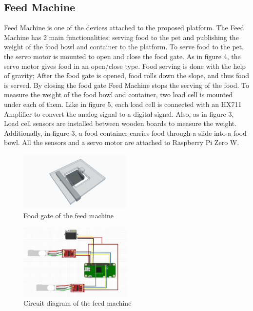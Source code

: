 \documentclass[conference]{IEEEtran}
\begin{document}
\subsection{Feed Machine}
Feed Machine is one of the devices attached to the proposed platform. The Feed Machine has 2 main functionalities: serving food to the pet and publishing the weight of the food bowl and container to the platform. To serve food to the pet, the servo motor is mounted to open and close the food gate. As in figure 4, the servo motor gives food in an open/close type. Food serving is done with the help of gravity; After the food gate is opened, food rolls down the slope, and thus food is served. By closing the food gate Feed Machine stops the serving of the food. To measure the weight of the food bowl and container, two load cell is mounted under each of them. Like in figure 5, each load cell is connected with an HX711 Amplifier to convert the analog signal to a digital signal. Also, as in figure 3, Load cell sensors are installed between wooden boards to measure the weight. Additionally, in figure 3, a food container carries food through a slide into a food bowl. All the sensors and a servo motor are attached to Raspberry Pi Zero W.

\begin{figure}[htbp]
\centerline{\includegraphics[width=0.5\textwidth]{./images/servo_gate.png}}
\caption{Food gate of the feed machine}
\label{fig}
\end{figure}

\begin{figure}[htbp]
\centerline{\includegraphics[width=0.5\textwidth]{./images/feed machine circuit.jpg}}
\caption{Circuit diagram of the feed machine}
\label{fig}
\end{figure}
\end{document}
